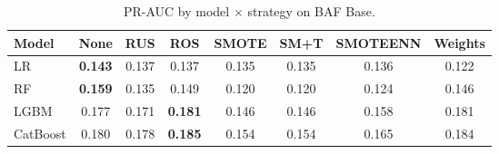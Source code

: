 \begin{table}[ht]
\centering
\caption{PR-AUC by model $\times$ strategy on BAF Base.}
\label{tab:factorial_baf_prauc}
\begin{tabular}{l c c c c c c c}
\toprule
Model & None & RUS & ROS & SMOTE & SM+T & SMOTEENN & Weights \\
\midrule
LR         & \textbf{0.143} & 0.137 & 0.137 & 0.135 & 0.135 & 0.136 & 0.122 \\
RF         & \textbf{0.159} & 0.135 & 0.149 & 0.120 & 0.120 & 0.124 & 0.146 \\
LGBM       & 0.177 & 0.171 & \textbf{0.181} & 0.146 & 0.146 & 0.158 & 0.181 \\
CatBoost   & 0.180 & 0.178 & \textbf{0.185} & 0.154 & 0.154 & 0.165 & 0.184 \\
\bottomrule
\end{tabular}
\end{table}